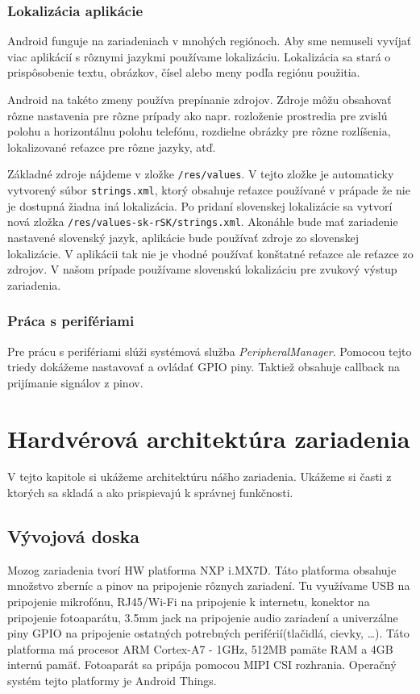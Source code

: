 \documentclass{template/socthesis}
\begin{document}
\subsection*{Lokalizácia aplikácie}
Android funguje na zariadeniach v mnohých regiónoch. Aby sme nemuseli vyvíjať viac aplikácií s rôznymi jazykmi používame lokalizáciu. Lokalizácia sa stará o prispôsobenie textu, obrázkov, čísel alebo meny podľa regiónu použitia. 

Android na takéto zmeny používa prepínanie zdrojov. Zdroje môžu obsahovať rôzne nastavenia pre rôzne prípady ako napr. rozloženie prostredia pre zvislú polohu a horizontálnu polohu telefónu, rozdielne obrázky pre rôzne rozlíšenia, lokalizované reťazce pre rôzne jazyky, atď.

Základné zdroje nájdeme v zložke \texttt{/res/values}. V tejto zložke je automaticky vytvorený súbor \texttt{strings.xml}, ktorý obsahuje reťazce používané v prápade že nie je dostupná žiadna iná lokalizácia. Po pridaní slovenskej lokalizácie sa vytvorí nová zložka \texttt{/res/values-sk-rSK/strings.xml}. Akonáhle bude mať zariadenie nastavené slovenský jazyk, aplikácie bude používať zdroje zo slovenskej lokalizácie. V aplikácii tak nie je vhodné používať konštatné reťazce ale reťazce zo zdrojov. V našom prípade používame slovenskú lokalizáciu pre zvukový výstup zariadenia.

\subsection*{Práca s perifériami}
Pre prácu s perifériami slúži systémová služba \textit{PeripheralManager}. Pomocou tejto triedy dokážeme nastavovať a ovládať  GPIO piny. Taktiež obsahuje callback na prijímanie signálov z pinov.
\newpage

\chapter{Hardvérová architektúra zariadenia}
V tejto kapitole si ukážeme architektúru nášho zariadenia. Ukážeme si časti z ktorých sa skladá a ako prispievajú k správnej funkčnosti.

\section{Vývojová doska}
Mozog zariadenia tvorí HW platforma NXP i.MX7D. Táto platforma obsahuje množstvo zberníc a pinov na pripojenie rôznych zariadení. Tu využívame USB na pripojenie mikrofónu, RJ45/Wi-Fi na pripojenie k internetu, konektor na pripojenie fotoaparátu, 3.5mm jack na pripojenie audio zariadení a univerzálne piny GPIO na pripojenie ostatných potrebných periférií(tlačidlá, cievky, …).
Táto platforma má procesor ARM Cortex-A7 - 1GHz, 512MB pamäte RAM a 4GB internú pamäť. Fotoaparát sa pripája pomocou MIPI CSI rozhrania. Operačný systém tejto platformy je Android Things.
\end{document}
